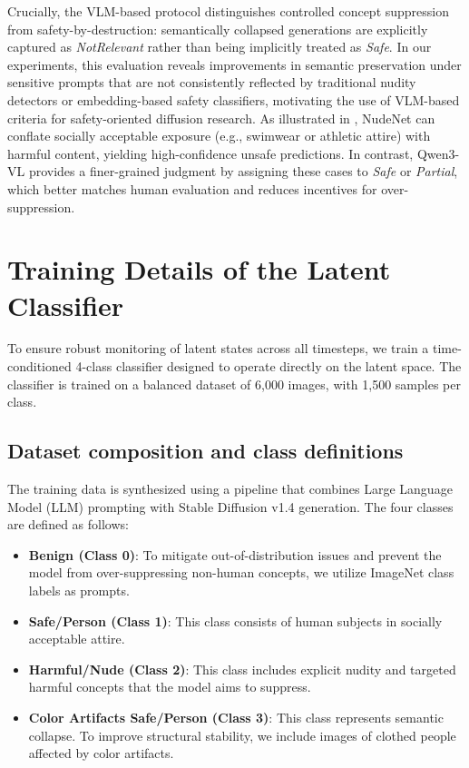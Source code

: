 Crucially, the VLM-based protocol distinguishes controlled concept suppression from safety-by-destruction: semantically collapsed generations are explicitly captured as \emph{NotRelevant} rather than being implicitly treated as \emph{Safe}. In our experiments, this evaluation reveals improvements in semantic preservation under sensitive prompts that are not consistently reflected by traditional nudity detectors or embedding-based safety classifiers, motivating the use of VLM-based criteria for safety-oriented diffusion research. As illustrated in , NudeNet can conflate socially acceptable exposure (e.g., swimwear or athletic attire) with harmful content, yielding high-confidence unsafe predictions. In contrast, Qwen3-VL provides a finer-grained judgment by assigning these cases to \emph{Safe} or \emph{Partial}, which better matches human evaluation and reduces incentives for over-suppression.

\section{Training Details of the Latent Classifier}
\label{appendix:classifier_training}

To ensure robust monitoring of latent states across all timesteps, we train a time-conditioned 4-class classifier designed to operate directly on the latent space. The classifier is trained on a balanced dataset of 6,000 images, with 1,500 samples per class.

\subsection{Dataset composition and class definitions}
The training data is synthesized using a pipeline that combines Large Language Model (LLM) prompting with Stable Diffusion v1.4 generation. The four classes are defined as follows:
\begin{itemize}
    \item \textbf{Benign (Class 0)}: To mitigate out-of-distribution issues and prevent the model from over-suppressing non-human concepts, we utilize ImageNet class labels as prompts.
    \item \textbf{Safe/Person (Class 1)}: This class consists of human subjects in socially acceptable attire.
    \item \textbf{Harmful/Nude (Class 2)}: This class includes explicit nudity and targeted harmful concepts that the model aims to suppress.
    \item \textbf{Color Artifacts Safe/Person (Class 3)}: This class represents semantic collapse. To improve structural stability, we include images of clothed people affected by color artifacts.
\end{itemize}

